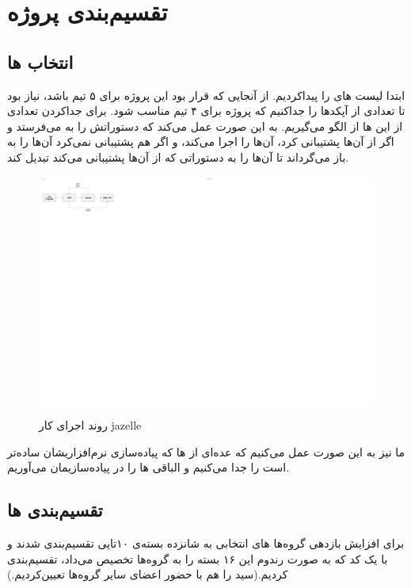 \section*{تقسیم‌بندی پروژه}
\subsection*{انتخاب
	ها}
ابتدا لیست
های
را پیداکردیم. از آنجایی که قرار بود این پروژه برای ۵ تیم باشد، نیاز بود تا تعدادی از آپکدها را جداکنیم که پروژه برای ۴ تیم مناسب شود.
برای جداکردن تعدادی از این
ها
از
الگو می‌گیریم. 
به این صورت عمل می‌کند که
دستوراتش را به
می‌فرستد و اگر
از آن‌ها پشتیبانی کرد، آن‌ها را اجرا می‌کند، و اگر هم پشتیبانی نمی‌کرد آن‌ها را به
باز می‌گرداند تا آن‌ها را به دستوراتی که
از آن‌ها پشتیبانی می‌کند تبدیل کند.
\begin{figure}[H]
	\centering
	\includegraphics[width=\linewidth]{flowchart}
	\caption{روند اجرای کار jazelle}
	\label{fig:flowchart}
\end{figure}

ما نیز به این صورت عمل می‌کنیم که عده‌ای از 
ها
که پیاده‌سازی نرم‌افزاریشان ساده‌تر است را جدا می‌کنیم و الباقی
ها 
را در پیاده‌سازیمان می‌آوریم.
\subsection*{تقسیم‌بندی 
	ها
}
برای افزایش بازدهی گروه‌ها
های
انتخابی به شانزده بسته‌ی ۱۰تایی تقسیم‌بندی شدند و با یک کد 
که به صورت رندوم این ۱۶ بسته را به گروه‌ها تخصیص می‌داد، تقسیم‌بندی کردیم.(سید را هم با حضور اعضای سایر گروه‌ها تعیین‌کردیم.)
